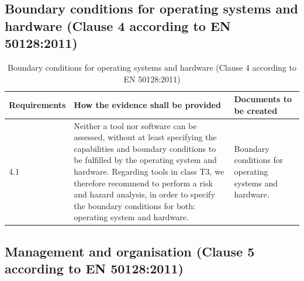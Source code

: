 \documentclass{template/openetcs_report}
\begin{document}
\subsection{Boundary conditions for operating systems and hardware (Clause 4 according to EN 50128:2011)}
{\footnotesize\sffamily\centering
\begin{longtable}{|p{2cm}|p{9cm}|p{3cm}|}
\caption{Boundary conditions for operating systems and hardware (Clause 4 according to EN 50128:2011)}\\
\hline
\bfseries Requirements & \bfseries How the evidence shall be provided & \bfseries Documents to be created\\
\hline
\hline
\endhead
\hline
\endfoot

4.1 & Neither a tool nor software can be assessed, without at least specifying the capabilities and boundary conditions to be fulfilled by the operating system and hardware. 
\linebreak
\linebreak
Regarding tools in class T3, we therefore recommend to perform a risk and hazard analysis, in order to specify the boundary conditions for both: operating system and hardware.
& Boundary conditions for operating systems and hardware.\\ 
\hline
\end{longtable}}


\subsection{Management and organisation (Clause 5 according to EN 50128:2011)}
\label{clause5}
\end{document}
